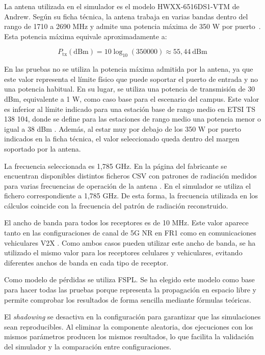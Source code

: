 La antena utilizada en el simulador es el modelo HWXX-6516DS1-VTM de Andrew. Según su ficha técnica, la antena trabaja en varias bandas dentro del rango de 1710 a 2690 MHz y admite una potencia máxima de 350 W por puerto~\cite{andrew_hwxx_datasheet}. Esta potencia máxima equivale aproximadamente a:

\[
P_{\mathrm{tx}}(\mathrm{dBm}) = 10 \log_{10}(350000) \approx 55,44\ \mathrm{dBm}
\]

En las pruebas no se utiliza la potencia máxima admitida por la antena, ya que este valor representa el límite físico que puede soportar el puerto de entrada y no una potencia habitual. En su lugar, se utiliza una potencia de transmisión de 30 dBm, equivalente a 1 W, como caso base para el escenario del campus. Este valor es inferior al límite indicado para una estación base de rango medio en ETSI TS 138 104, donde se define para las estaciones de rango medio una potencia menor o igual a 38 dBm \cite{etsi138104}. Además, al estar muy por debajo de los 350 W por puerto indicados en la ficha técnica, el valor seleccionado queda dentro del margen soportado por la antena.

La frecuencia seleccionada es 1,785 GHz. En la página del fabricante se encuentran disponibles distintos ficheros CSV con patrones de radiación medidos para varias frecuencias de operación de la antena \cite{andrew_hwxx_product}. En el simulador se utiliza el fichero correspondiente a 1,785 GHz. De esta forma, la frecuencia utilizada en los cálculos coincide con la frecuencia del patrón de radiación reconstruido.

El ancho de banda para todos los receptores es de 10 MHz. Este valor aparece tanto en las configuraciones de canal de 5G NR en FR1 \cite{etsi138104} como en comunicaciones vehiculares V2X \cite{etsi302663}. Como ambos casos pueden utilizar este ancho de banda, se ha utilizado el mismo valor para los receptores celulares y vehiculares, evitando diferentes anchos de banda en cada tipo de receptor.

Como modelo de pérdidas se utiliza FSPL. Se ha elegido este modelo como base para hacer todas las pruebas porque representa la propagación en espacio libre y permite comprobar los resultados de forma sencilla mediante fórmulas teóricas.

El \textit{shadowing} se desactiva en la configuración para garantizar que las simulaciones sean reproducibles. Al eliminar la componente aleatoria, dos ejecuciones con los mismos parámetros producen los mismos resultados, lo que facilita la validación del simulador y la comparación entre configuraciones.

